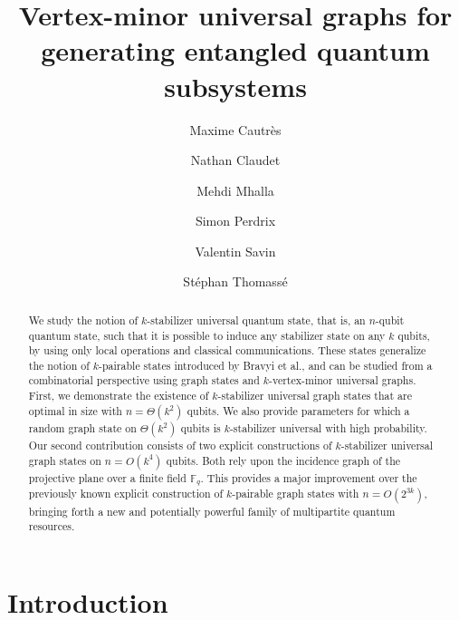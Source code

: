 \documentclass[a4paper,UKenglish,cleveref, autoref, thm-restate]{arxiv}
\title{Vertex-minor universal graphs for  generating  entangled quantum subsystems}
\author{Maxime Cautrès}{Universit\'e Grenoble Alpes, CEA-L\'eti, F-38054 Grenoble, France \and École Normale Supérieure de Lyon, F-69007 Lyon, France }{maxime.cautres@ens-lyon.org}{https://orcid.org/0000-0002-7899-1866}{}%
\author{Nathan Claudet}{Inria Mocqua, LORIA, CNRS, Université de Lorraine, F-54000 Nancy, France}{nathan.claudet@inria.fr}{https://orcid.org/0009-0000-0862-1264}{}
\author{Mehdi Mhalla}{Université Grenoble Alpes, CNRS, Grenoble INP, LIG, F-38000 Grenoble, France}{mehdi.mhalla@univ-grenoble-alpes.fr}{https://orcid.org/0000-0003-4178-5396}{}
\author{Simon Perdrix}{Inria Mocqua, LORIA, CNRS, Université de Lorraine, F-54000 Nancy, France}{simon.perdrix@loria.fr}{https://orcid.org/0000-0002-1808-2409}{}
\author{Valentin Savin}{ Universit\'e Grenoble Alpes, CEA-L\'eti, F-38054 Grenoble, France}{valentin.savin@cea.fr}{https://orcid.org/0000-0001-9362-8769}{}
\author{Stéphan Thomassé}{Université de Lyon, École Normale Supérieure de Lyon, UCBL, CNRS, LIP, F-69007 Lyon, France}{stephan.thomasse@ens-lyon.fr}{https://orcid.org/0000-0002-7090-1790}{}
\begin{document}
\maketitle

\begin{abstract}
We study the notion of  $k$-stabilizer universal quantum state, that is, an $n$-qubit quantum state, such that it is possible to induce any stabilizer state on any $k$ qubits, by using only local operations and classical communications. These states generalize the notion of $k$-pairable states introduced by Bravyi et al., and can be studied from a combinatorial perspective using graph states and $k$-vertex-minor universal graphs. First, we demonstrate the existence of $k$-stabilizer universal graph states that are optimal in size with $n=\Theta(k^2)$ qubits. We also provide parameters for which a random graph state on $\Theta(k^2)$ qubits is $k$-stabilizer universal with high probability. Our second  contribution consists of two explicit constructions of $k$-stabilizer universal graph states on $n = O(k^4)$ qubits. Both  rely upon the incidence graph of the projective plane over a finite field $\mathbb{F}_q$. This provides a major improvement over the previously known explicit construction of $k$-pairable graph states with $n = O(2^{3k})$, 
bringing forth a new and potentially powerful family of multipartite quantum resources.
\end{abstract}

\section{Introduction}
\end{document}

